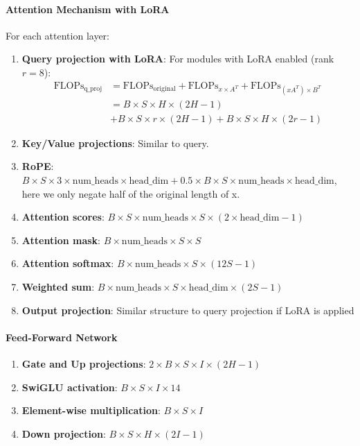 \documentclass{article}
\begin{document}
\paragraph{Attention Mechanism with LoRA}
For each attention layer:
\begin{enumerate}
    \item \textbf{Query projection with LoRA}: For modules with LoRA enabled (rank $r=8$):
    \begin{align}
    \text{FLOPs}_{\text{q\_proj}} &= \text{FLOPs}_{\text{original}} + \text{FLOPs}_{x \times A^T} + \text{FLOPs}_{(xA^T) \times B^T}\\
    &= B\times S \times H \times (2H-1) \\
    &+ B\times S \times r \times (2H-1) + B\times S \times H \times (2r-1)
    \end{align}
    
    \item \textbf{Key/Value projections}: Similar to query.
    \item \textbf{RoPE}: $B\times S \times 3 \times \text{num\_heads} \times \text{head\_dim} + 0.5 \times B \times S \times \text{num\_heads} \times \text{head\_dim}$, here we only negate half of the original length of x.
    \item \textbf{Attention scores}: $B\times S \times \text{num\_heads} \times S \times (2 \times \text{head\_dim} - 1)$
    \item \textbf{Attention mask}: $B \times \text{num\_heads} \times S \times S$
    \item \textbf{Attention softmax}: $B \times \text{num\_heads} \times S \times (12S - 1)$
    \item \textbf{Weighted sum}: $B \times \text{num\_heads} \times S \times \text{head\_dim} \times (2S - 1)$
    \item \textbf{Output projection}: Similar structure to query projection if LoRA is applied
\end{enumerate}

\paragraph{Feed-Forward Network}
\begin{enumerate}
    \item \textbf{Gate and Up projections}: $2 \times B\times S \times I \times (2H - 1)$
    \item \textbf{SwiGLU activation}: $B\times S \times I \times 14$
    \item \textbf{Element-wise multiplication}: $B\times S \times I$
    \item \textbf{Down projection}: $B\times S \times H \times (2I - 1)$
\end{enumerate}
\end{document}
